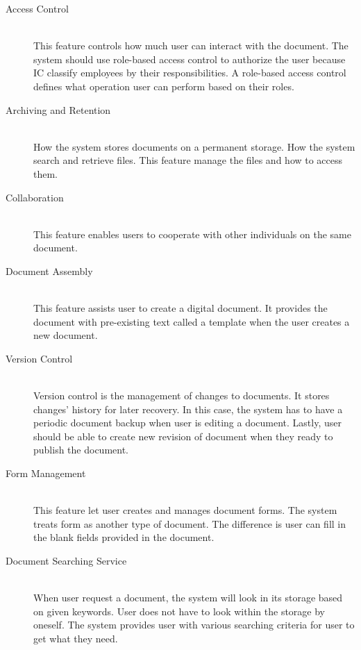 \begin{description}
\item[Access Control] \hfill \\
This feature controls how much user can interact with the document.
The system should use role-based access control to authorize the user because IC classify employees by their responsibilities.
A role-based access control defines what operation user can perform based on their roles.

\item[Archiving and Retention] \hfill \\
How the system stores documents on a permanent storage.
How the system search and retrieve files.
This feature manage the files and how to access them.

\item[Collaboration] \hfill \\
This feature enables users to cooperate with other individuals on the same document. 

\item[Document Assembly] \hfill \\
This feature assists user to create a digital document.
It provides the document with pre-existing text called a template when the user creates a new document.

\item[Version Control] \hfill \\
Version control is the management of changes to documents.
It stores changes' history for later recovery.
In this case, the system has to have a periodic document backup when user is editing a document.
Lastly, user should be able to create new revision of document when they ready to publish the document.

\item[Form Management] \hfill \\
This feature let user creates and manages document forms.
The system treats form as another type of document.
The difference is user can fill in the blank fields provided in the document.

\item[Document Searching Service] \hfill \\
When user request a document, the system will look in its storage based on given keywords.
User does not have to look within the storage by oneself.
The system provides user with various searching criteria for user to get what they need.
\end{description}

